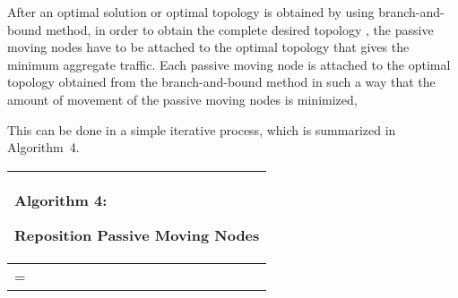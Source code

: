 \documentclass[10pt,conference]{IEEEtran}
\begin{document}
After an optimal solution or optimal topology is obtained by using
branch-and-bound method, in order to obtain the complete desired
topology , the passive moving nodes have to be
attached to the optimal topology  that gives the minimum
aggregate traffic. Each passive moving node is attached to the optimal
topology obtained from the branch-and-bound method in such a way that
the amount of movement of the passive moving nodes is minimized,

This can be done in a simple
iterative process, which is summarized in Algorithm~4.
\begin{algorithm}[t]

\begin{tabular}[c]{p{8cm}}


  \hline
  {\scriptsize
    \begin{bf}Algorithm 4: \end{bf} Reposition Passive
    Moving Nodes }\\
  \hline
\SetKwFunction{AN}{AttachNode}
\SetKwFunction{GAL}{GetAnchorLabel}
\SetKwFunction{GDL}{GetDesiredLabel}

{\scriptsize
  \KwIn{, graph
    with all active moving nodes attached to graph of non-moving
    nodes, , according to optimization
    routine; \PM , set of passive moving nodes }

\KwOut{, final graph
  topology with passive moving nodes attached}

\; 
\ForEach{} {

   \;

\ForEach{}{

 = \AN{u,v,} \;

 \;

\If{}{
   \;
   \;

 }


}
 = \AN{u,,}\;



}

}
\\
\hline


\end{tabular}

\end{algorithm}
\end{document}
